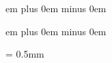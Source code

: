 \newskip\afterinitialshift
{} em plus 0em minus 0em

\newskip\beforeinitialshift
{} em plus 0em minus 0em


\newdimen\aboveinitialseparation
\aboveinitialseparation = 0.5mm

\def\setaboveinitialseparation#1{
\aboveinitialseparation=#1%
\relax %
}

\def\setspaceafterinitial#1{%
\afterinitialshift=#1 %
\relax %
}

\def\setspacebeforeinitial#1{%
\beforeinitialshift=#1 %
\relax %
}

\newskip\clefchangespace

